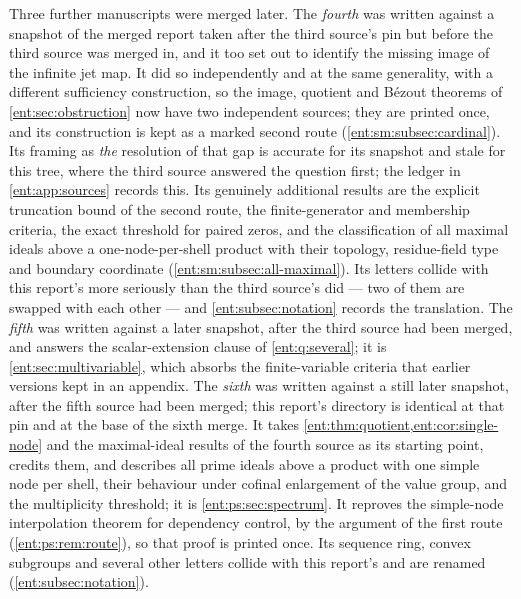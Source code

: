 \documentclass[11pt]{article}
\theoremstyle{plain}
\theoremstyle{plain}
\theoremstyle{plain}
\theoremstyle{definition}
\theoremstyle{definition}
\theoremstyle{definition}
\theoremstyle{definition}
\theoremstyle{remark}
\begin{document}
Three further manuscripts were merged later. The \emph{fourth} was written
against a snapshot of the merged report taken after the third source's pin
but before the third source was merged in, and it too set out to identify
the missing image of the infinite jet map. It did so independently and at the same
generality, with a different sufficiency construction, so the image,
quotient and B\'ezout theorems of \cref{ent:sec:obstruction} now have two
independent sources; they are printed once, and its construction is kept as
a marked second route (\cref{ent:sm:subsec:cardinal}). Its framing as
\emph{the} resolution of that gap is accurate for its snapshot and stale for
this tree, where the third source answered the question first; the ledger in
\cref{ent:app:sources} records this. Its genuinely additional results are
the explicit truncation bound of the second route, the finite-generator and
membership criteria, the exact threshold for paired zeros, and the
classification of all maximal ideals above a one-node-per-shell product with
their topology, residue-field type and boundary coordinate
(\cref{ent:sm:subsec:all-maximal}). Its letters collide with this report's
more seriously than the third source's did --- two of them are swapped with
each other --- and \cref{ent:subsec:notation} records the translation. The
\emph{fifth} was written against a later snapshot, after the third source
had been merged, and answers the scalar-extension clause of
\cref{ent:q:several}; it is \cref{ent:sec:multivariable}, which absorbs the
finite-variable criteria that earlier versions kept in an appendix. The
\emph{sixth} was written against a still later snapshot, after the fifth
source had been merged; this report's directory is identical at that pin and
at the base of the sixth merge. It takes
\cref{ent:thm:quotient,ent:cor:single-node} and the maximal-ideal results of
the fourth source as its starting point, credits them, and describes all
prime ideals above a product with one simple node per shell, their
behaviour under cofinal enlargement of the value group, and the
multiplicity threshold; it is \cref{ent:ps:sec:spectrum}. It reproves the
simple-node interpolation theorem for dependency control, by the argument of
the first route (\cref{ent:ps:rem:route}), so that proof is printed once.
Its sequence ring, convex subgroups and several other letters collide with
this report's and are renamed (\cref{ent:subsec:notation}).
\end{document}
